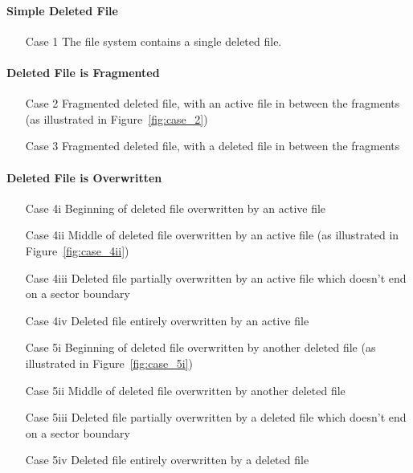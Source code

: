 \documentclass{ws-rv9x6}
\newenvironment{paraphrase}{\color{blue}}{\color{black}} %
\begin{document}
\begin{paraphrase}
\paragraph{Simple Deleted File}
\begin{itemize}%
    \item [Case 1] The file system contains a single deleted file.
\end{itemize}
\paragraph{Deleted File is Fragmented}
\begin{itemize}%
    \item [Case 2] Fragmented deleted file, with an active file in between the fragments (as illustrated in Figure~\ref{fig:case_2})
    \item [Case 3] Fragmented deleted file, with a deleted file in between the fragments
\end{itemize}
\paragraph{Deleted File is Overwritten}
\begin{itemize}%
    \item [Case 4i] Beginning of deleted file overwritten by an active file
    \item [Case 4ii] Middle of deleted file overwritten by an active file (as illustrated in Figure~\ref{fig:case_4ii})
    \item [Case 4iii] Deleted file partially overwritten by an active file which doesn't end on a sector boundary
    \item [Case 4iv] Deleted file entirely overwritten by an active file
    \item [Case 5i] Beginning of deleted file overwritten by another deleted file (as illustrated in Figure~\ref{fig:case_5i})
    \item [Case 5ii] Middle of deleted file overwritten by another deleted file
    \item [Case 5iii] Deleted file partially overwritten by a deleted file which doesn't end on a sector boundary
    \item [Case 5iv] Deleted file entirely overwritten by a deleted file
\end{itemize}

\end{paraphrase}
\end{document}
